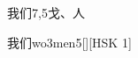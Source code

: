 \begin{entry}{我们}{7,5}{⼽、⼈}
  \begin{phonetics}{我们}{wo3men5}[][HSK 1]
  \end{phonetics}
\end{entry}
